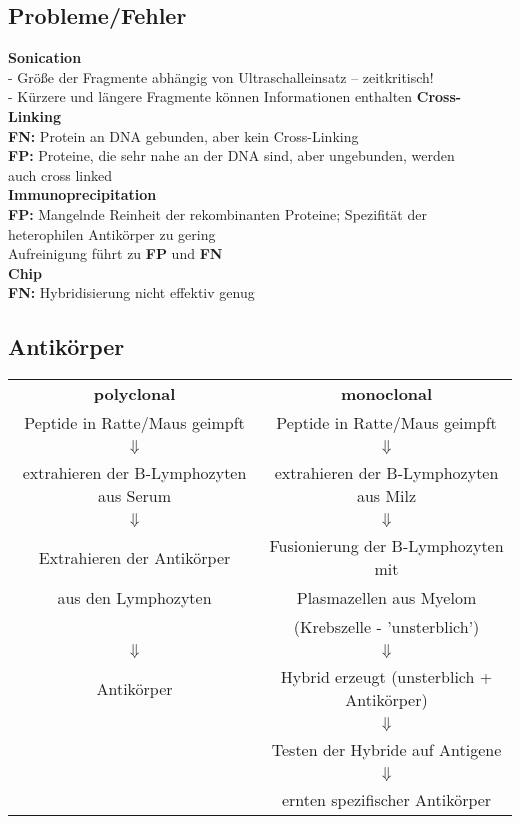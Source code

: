 \subsection{Probleme/Fehler}
\textbf{Sonication}\\
\hspace*{10mm}- Größe der Fragmente abhängig von Ultraschalleinsatz – zeitkritisch!\\
\hspace*{10mm}- Kürzere und längere Fragmente können Informationen enthalten
\textbf{Cross-Linking}\\
\hspace*{10mm}\textbf{FN:} Protein an DNA gebunden, aber kein Cross-Linking\\
\hspace*{10mm}\textbf{FP:} Proteine, die sehr nahe an der DNA sind, aber ungebunden, werden\\ \hspace*{19mm}auch cross linked\\
\textbf{Immunoprecipitation}\\
\hspace*{10mm}\textbf{FP:} Mangelnde Reinheit der rekombinanten Proteine; Spezifität der\\
\hspace*{19mm}heterophilen Antikörper zu gering\\
\hspace*{19mm}Aufreinigung führt zu \textbf{FP} und \textbf{FN}\\
\textbf{Chip}\\
\hspace*{10mm}\textbf{FN:} Hybridisierung nicht effektiv genug

\subsection{Antikörper}
\begin{tabular}{cc}
  \textbf{polyclonal} & \textbf{monoclonal}\\
  Peptide in Ratte/Maus geimpft & Peptide in Ratte/Maus geimpft\\
  $\Downarrow$ & $\Downarrow$\\
  extrahieren der B-Lymphozyten aus Serum & extrahieren der B-Lymphozyten aus Milz\\
  $\Downarrow$ & $\Downarrow$\\
  Extrahieren der Antikörper &Fusionierung der B-Lymphozyten mit\\ 
   aus den Lymphozyten & Plasmazellen aus Myelom\\
   & (Krebszelle - 'unsterblich')\\
  $\Downarrow$ & $\Downarrow$\\
  Antikörper & Hybrid erzeugt (unsterblich + Antikörper)\\
  & $\Downarrow$\\
  & Testen der Hybride auf Antigene\\
  & $\Downarrow$\\
  & ernten spezifischer Antikörper
\end{tabular}